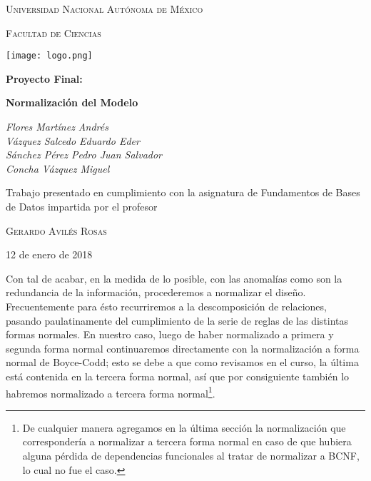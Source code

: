 \documentclass[11pt,letterpaper]{article}
\begin{document}
\begin{titlepage}
	\centering
	{\scshape\LARGE Universidad Nacional Autónoma de México \par}
	\vspace{1cm}
	{\scshape\Large Facultad de Ciencias\par}
	\vspace{1.5cm}
\begin{center}
		\texttt{[image: logo.png]}
	\end{center}
		\vspace{.8 cm}

	{\huge\bfseries Proyecto Final: \par}
	{\huge\bfseries Normalización del Modelo \par}
		\vspace{0.5cm}

	{\Large\itshape Flores Martínez Andrés\\
	Vázquez Salcedo Eduardo Eder\\
	Sánchez Pérez Pedro Juan Salvador\\
	Concha Vázquez Miguel\par}
	\vfill
			\vspace{0.5cm}

	Trabajo presentado en cumplimiento con la asignatura de Fundamentos de Bases de Datos impartida por el profesor	\par
	 \textsc{Gerardo Avilés Rosas}\\
	\vspace{0.1cm}
	{\large 12 de enero de 2018\par}
\end{titlepage}

\begin{center}
\tableofcontents
\end{center}

\newpage

Con tal de acabar, en la medida de lo posible, con las anomalías como son la redundancia de la información, procederemos a normalizar el diseño. Frecuentemente para ésto recurriremos a la descomposición de relaciones, pasando paulatinamente del cumplimiento de la serie de reglas de las distintas formas normales. En nuestro caso, luego de haber normalizado a primera y segunda forma normal continuaremos directamente con la normalización a forma normal de Boyce-Codd; esto se debe a que como revisamos en el curso, la última está contenida en la tercera forma normal, así que por consiguiente también lo habremos normalizado a tercera forma normal\footnote{De cualquier manera agregamos en la última sección la normalización que correspondería a normalizar a tercera forma normal en caso de que hubiera alguna pérdida de dependencias funcionales al tratar de normalizar a BCNF, lo cual no fue el caso.}. \\
\end{document}
